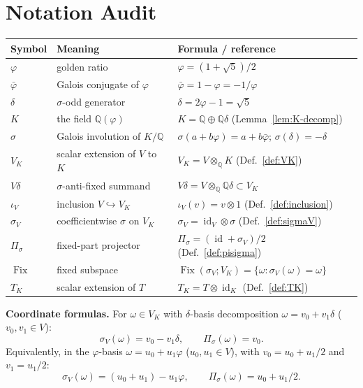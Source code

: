 \documentclass[11pt, a4paper]{amsart}
\theoremstyle{definition}
\newcommand{\Q}{\mathbb{Q}}
\newcommand{\Fix}{\operatorname{Fix}}
\newcommand{\id}{\operatorname{id}}
\begin{document}
\appendix
\section{Notation Audit}
\label{app:notation}

\begin{center}
\begin{tabular}{lll}
\hline
Symbol & Meaning & Formula / reference \\
\hline
$\varphi$ & golden ratio & $\varphi = (1+\sqrt{5})/2$ \\
$\bar\varphi$ & Galois conjugate of $\varphi$ & $\bar\varphi = 1 - \varphi = -1/\varphi$ \\
$\delta$ & $\sigma$-odd generator & $\delta = 2\varphi - 1 = \sqrt{5}$ \\
$K$ & the field $\Q(\varphi)$ & $K = \Q \oplus \Q\delta$ (Lemma~\ref{lem:K-decomp}) \\
$\sigma$ & Galois involution of $K/\Q$ & $\sigma(a + b\varphi) = a + b\bar\varphi$; $\sigma(\delta) = -\delta$ \\
$V_K$ & scalar extension of $V$ to $K$ & $V_K = V \otimes_\Q K$ (Def.~\ref{def:VK}) \\
$V\delta$ & $\sigma$-anti-fixed summand & $V\delta = V \otimes_\Q \Q\delta \subset V_K$ \\
$\iota_V$ & inclusion $V \hookrightarrow V_K$ & $\iota_V(v) = v \otimes 1$ (Def.~\ref{def:inclusion}) \\
$\sigma_V$ & coefficientwise $\sigma$ on $V_K$ & $\sigma_V = \id_V \otimes \sigma$ (Def.~\ref{def:sigmaV}) \\
$\Pi_\sigma$ & fixed-part projector & $\Pi_\sigma = (\id + \sigma_V)/2$ (Def.~\ref{def:pisigma}) \\
$\Fix$ & fixed subspace & $\Fix(\sigma_V; V_K) = \{\omega : \sigma_V(\omega) = \omega\}$ \\
$T_K$ & scalar extension of $T$ & $T_K = T \otimes \id_K$ (Def.~\ref{def:TK}) \\
\hline
\end{tabular}
\end{center}

\bigskip

\noindent\textbf{Coordinate formulas.} For $\omega \in V_K$ with
$\delta$-basis decomposition $\omega = v_0 + v_1 \delta$ ($v_0, v_1
\in V$):
\[
  \sigma_V(\omega) = v_0 - v_1 \delta, \qquad
  \Pi_\sigma(\omega) = v_0.
\]
Equivalently, in the $\varphi$-basis $\omega = u_0 + u_1 \varphi$
($u_0, u_1 \in V$), with $v_0 = u_0 + u_1/2$ and $v_1 = u_1/2$:
\[
  \sigma_V(\omega) = (u_0 + u_1) - u_1 \varphi, \qquad
  \Pi_\sigma(\omega) = u_0 + u_1/2.
\]
\end{document}
